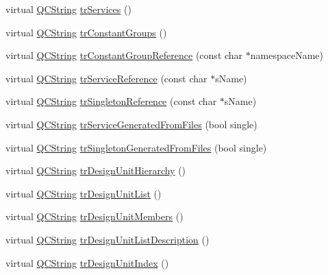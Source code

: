 \begin{DoxyCompactItemize}
\item 
virtual \mbox{\hyperlink{class_q_c_string}{Q\+C\+String}} \mbox{\hyperlink{class_translator_french_a35fefa9d487131185ef6046ac7a0b45d}{tr\+Services}} ()
\item 
virtual \mbox{\hyperlink{class_q_c_string}{Q\+C\+String}} \mbox{\hyperlink{class_translator_french_a030b6a754c5477dc55c559a169c91829}{tr\+Constant\+Groups}} ()
\item 
virtual \mbox{\hyperlink{class_q_c_string}{Q\+C\+String}} \mbox{\hyperlink{class_translator_french_aa54b61067736039ebb3d9d62b927c9c5}{tr\+Constant\+Group\+Reference}} (const char $\ast$namespace\+Name)
\item 
virtual \mbox{\hyperlink{class_q_c_string}{Q\+C\+String}} \mbox{\hyperlink{class_translator_french_acbb64495833130e53bb3bc6bc3695f66}{tr\+Service\+Reference}} (const char $\ast$s\+Name)
\item 
virtual \mbox{\hyperlink{class_q_c_string}{Q\+C\+String}} \mbox{\hyperlink{class_translator_french_ae907e87a534e08bd06a29acc078ab433}{tr\+Singleton\+Reference}} (const char $\ast$s\+Name)
\item 
virtual \mbox{\hyperlink{class_q_c_string}{Q\+C\+String}} \mbox{\hyperlink{class_translator_french_a733d2815c17cb1a5581c118b80a3fdb9}{tr\+Service\+Generated\+From\+Files}} (bool single)
\item 
virtual \mbox{\hyperlink{class_q_c_string}{Q\+C\+String}} \mbox{\hyperlink{class_translator_french_af5b3e1ad038d0a664861469be7854d99}{tr\+Singleton\+Generated\+From\+Files}} (bool single)
\item 
virtual \mbox{\hyperlink{class_q_c_string}{Q\+C\+String}} \mbox{\hyperlink{class_translator_french_a2799be4d88e271225a220615ee79f5c0}{tr\+Design\+Unit\+Hierarchy}} ()
\item 
virtual \mbox{\hyperlink{class_q_c_string}{Q\+C\+String}} \mbox{\hyperlink{class_translator_french_a908b46f9a72448669780b22e9badd77d}{tr\+Design\+Unit\+List}} ()
\item 
virtual \mbox{\hyperlink{class_q_c_string}{Q\+C\+String}} \mbox{\hyperlink{class_translator_french_a8ad669c0ac30eb572318ff0274c0ae2b}{tr\+Design\+Unit\+Members}} ()
\item 
virtual \mbox{\hyperlink{class_q_c_string}{Q\+C\+String}} \mbox{\hyperlink{class_translator_french_a86e2cdda623ace883c1c856767084d38}{tr\+Design\+Unit\+List\+Description}} ()
\item 
virtual \mbox{\hyperlink{class_q_c_string}{Q\+C\+String}} \mbox{\hyperlink{class_translator_french_a2b324ca71516ec4313295fcc37d74ba8}{tr\+Design\+Unit\+Index}} ()

\end{DoxyCompactItemize}
